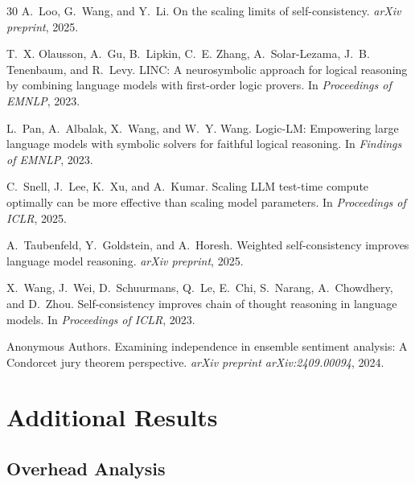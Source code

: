 \documentclass[11pt,a4paper]{article}
\begin{document}
\begin{thebibliography}{30}
A.~Loo, G.~Wang, and Y.~Li.
\newblock On the scaling limits of self-consistency.
\newblock \emph{arXiv preprint}, 2025.

T.~X. Olausson, A.~Gu, B.~Lipkin, C.~E. Zhang, A.~Solar-Lezama, J.~B. Tenenbaum, and R.~Levy.
\newblock LINC: A neurosymbolic approach for logical reasoning by combining language models with first-order logic provers.
\newblock In \emph{Proceedings of EMNLP}, 2023.

L.~Pan, A.~Albalak, X.~Wang, and W.~Y. Wang.
\newblock Logic-LM: Empowering large language models with symbolic solvers for faithful logical reasoning.
\newblock In \emph{Findings of EMNLP}, 2023.

C.~Snell, J.~Lee, K.~Xu, and A.~Kumar.
\newblock Scaling LLM test-time compute optimally can be more effective than scaling model parameters.
\newblock In \emph{Proceedings of ICLR}, 2025.

A.~Taubenfeld, Y.~Goldstein, and A.~Horesh.
\newblock Weighted self-consistency improves language model reasoning.
\newblock \emph{arXiv preprint}, 2025.

X.~Wang, J.~Wei, D.~Schuurmans, Q.~Le, E.~Chi, S.~Narang, A.~Chowdhery, and D.~Zhou.
\newblock Self-consistency improves chain of thought reasoning in language models.
\newblock In \emph{Proceedings of ICLR}, 2023.

{Anonymous Authors}.
\newblock Examining independence in ensemble sentiment analysis: A Condorcet jury theorem perspective.
\newblock \emph{arXiv preprint arXiv:2409.00094}, 2024.

\end{thebibliography}
\endgroup


\clearpage
\appendix
\section{Additional Results}

\subsection{Overhead Analysis}
\end{document}
